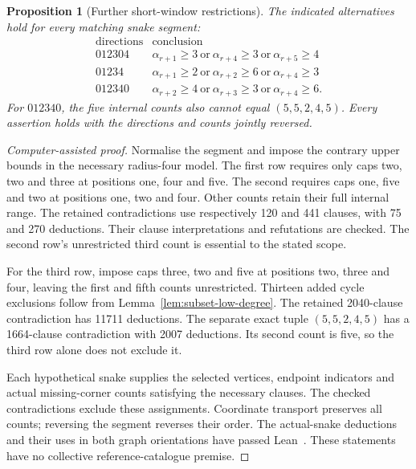 \documentclass[11pt,a4paper]{article}
\newtheorem{proposition}[theorem]{Proposition}
\theoremstyle{definition}
\theoremstyle{remark}
\begin{document}
\begin{proposition}[Further short-window restrictions]\label{prop:recent-counts}
The indicated alternatives hold for every matching snake segment:
\[
\begin{array}{c|l}
\text{directions}&\text{conclusion}\\\hline
012304&\alpha_{r+1}\ge3\ \text{or}\ \alpha_{r+4}\ge3\ \text{or}\ \alpha_{r+5}\ge4\\
01234&\alpha_{r+1}\ge2\ \text{or}\ \alpha_{r+2}\ge6\ \text{or}\ \alpha_{r+4}\ge3\\
012340&\alpha_{r+2}\ge4\ \text{or}\ \alpha_{r+3}\ge3\ \text{or}\ \alpha_{r+4}\ge6.
\end{array}
\]
For $012340$, the five internal counts also cannot equal $(5,5,2,4,5)$.
Every assertion holds with the directions and counts jointly reversed.
\end{proposition}
\begin{proof}[Computer-assisted proof]
Normalise the segment and impose the contrary upper bounds in the necessary
radius-four model. The first row requires only caps two, two and three at
positions one, four and five. The second requires caps one, five and two at
positions one, two and four. Other counts retain their full internal range.
The retained contradictions use respectively 120 and 441 clauses, with 75
and 270 deductions. Their clause interpretations and refutations are checked.
The second row's unrestricted third count is essential to the stated scope.

For the third row, impose caps three, two and five at positions two, three
and four, leaving the first and fifth counts unrestricted. Thirteen added
cycle exclusions follow from Lemma~\ref{lem:subset-low-degree}. The retained
2040-clause contradiction has 11711 deductions. The separate exact tuple
$(5,5,2,4,5)$ has a 1664-clause contradiction with 2007 deductions.
Its second count is five, so the third row alone does not exclude it.

Each hypothetical snake supplies the selected vertices, endpoint indicators
and actual missing-corner counts satisfying the necessary clauses. The
checked contradictions exclude these assignments. Coordinate transport
preserves all counts; reversing the segment reverses their order. The
actual-snake deductions and their uses in both graph orientations have
passed Lean~\cite{recoveryarchive,criticalcountarchive}. These statements
have no collective reference-catalogue premise.
\end{proof}
\end{document}
